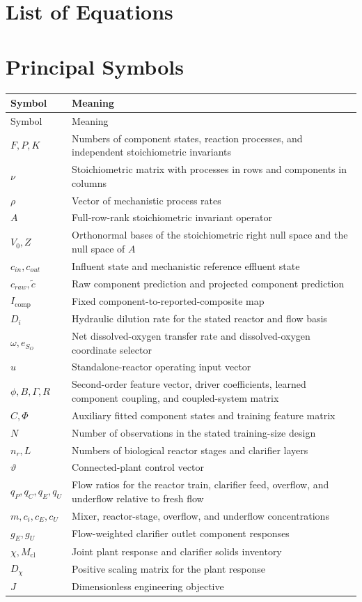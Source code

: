 \documentclass[12pt,twoside]{book}
\makeatletter
\newcommand{\listofequations}{%
    \chapter*{List of Equations}%
    \addcontentsline{toc}{chapter}{List of Equations}%
    \@starttoc{loe}%
}
\makeatother
\begin{document}
\cleardoublepage
\listofequations

\cleardoublepage
\chapter*{Principal Symbols}
\begin{longtable}{p{}p{}}
\toprule
Symbol & Meaning \\
\midrule
\endfirsthead
\toprule Symbol & Meaning \\
\midrule
\endhead
$F,P,K$ & Numbers of component states, reaction processes, and independent stoichiometric invariants \\
$\nu$ & Stoichiometric matrix with processes in rows and components in columns \\
$\rho$ & Vector of mechanistic process rates \\
$A$ & Full-row-rank stoichiometric invariant operator \\
$V_0,Z$ & Orthonormal bases of the stoichiometric right null space and the null space of $A$ \\
$c_{in},c_{out}$ & Influent state and mechanistic reference effluent state \\
$c_{raw},\widetilde c$ & Raw component prediction and projected component prediction \\
$I_{\mathrm{comp}}$ & Fixed component-to-reported-composite map \\
$D_i$ & Hydraulic dilution rate for the stated reactor and flow basis \\
$\omega,e_{S_O}$ & Net dissolved-oxygen transfer rate and dissolved-oxygen coordinate selector \\
$u$ & Standalone-reactor operating input vector \\
$\phi,B,\Gamma,R$ & Second-order feature vector, driver coefficients, learned component coupling, and coupled-system matrix \\
$\widehat C,\Phi$ & Auxiliary fitted component states and training feature matrix \\
$N$ & Number of observations in the stated training-size design \\
$n_r,L$ & Numbers of biological reactor stages and clarifier layers \\
$\vartheta$ & Connected-plant control vector \\
$q_P,q_C,q_E,q_U$ & Flow ratios for the reactor train, clarifier feed, overflow, and underflow relative to fresh flow \\
$m,c_i,c_E,c_U$ & Mixer, reactor-stage, overflow, and underflow concentrations \\
$g_E,g_U$ & Flow-weighted clarifier outlet component responses \\
$\chi,M_{\mathrm{cl}}$ & Joint plant response and clarifier solids inventory \\
$D_\chi$ & Positive scaling matrix for the plant response \\
$J$ & Dimensionless engineering objective \\
\bottomrule
\end{longtable}
\end{document}
